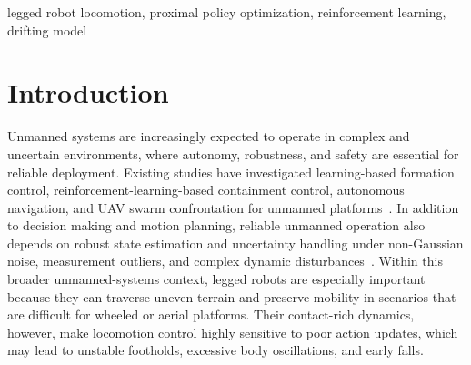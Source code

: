 \documentclass[conference]{IEEEtran}
\begin{document}
\begin{abstract}
Legged robot locomotion requires control policies that generate stable, smooth, and adaptive motions under high-dimensional nonlinear dynamics. Reinforcement learning (RL) has become an effective solution to this problem, and Proximal Policy Optimization (PPO) is widely adopted because of its clipped policy update and strong empirical performance. However, PPO mainly adjusts the likelihood of sampled actions according to scalar advantages and does not explicitly model how actions should move toward more favorable regions in continuous action space. To address this limitation, this paper proposes an Advantage-Guided Drift-Assisted PPO (AGD-PPO) method for legged robot locomotion. A lightweight drifting model is introduced to learn local action-space improvement directions from positive-advantage samples, and the resulting drift actions are used as auxiliary supervision for the actor while the original PPO clipped objective is retained. Experiments on ANYmal-C, A1, and Cassie show that AGD-PPO improves the final reward by 8.80\%, 9.65\%, and 17.77\%, respectively, while maintaining comparable mean rollout lengths. These results indicate that explicit action-space guidance can improve both learning efficiency and final locomotion performance within a standard PPO framework.
\end{abstract}

\begin{IEEEkeywords}
legged robot locomotion, proximal policy optimization, reinforcement learning, drifting model
\end{IEEEkeywords}


\section{Introduction}
\label{sec:introduction}

Unmanned systems are increasingly expected to operate in complex and uncertain environments, where autonomy, robustness, and safety are essential for reliable deployment. Existing studies have investigated learning-based formation control, reinforcement-learning-based containment control, autonomous navigation, and UAV swarm confrontation for unmanned platforms~\cite{zhou2023adaptive,miao2024optimized,yang2024autonomous,jiao2024uav}. In addition to decision making and motion planning, reliable unmanned operation also depends on robust state estimation and uncertainty handling under non-Gaussian noise, measurement outliers, and complex dynamic disturbances~\cite{zhong2023pseudolinear,zhong2024kalman,zhong2024robust,zhong2025outlier}. Within this broader unmanned-systems context, legged robots are especially important because they can traverse uneven terrain and preserve mobility in scenarios that are difficult for wheeled or aerial platforms. Their contact-rich dynamics, however, make locomotion control highly sensitive to poor action updates, which may lead to unstable footholds, excessive body oscillations, and early falls.
\end{document}
